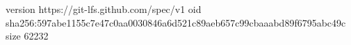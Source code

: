 version https://git-lfs.github.com/spec/v1
oid sha256:597abe1155c7e47c0aa0030846a6d521c89aeb657c99cbaaabd89f6795abc49c
size 62232
